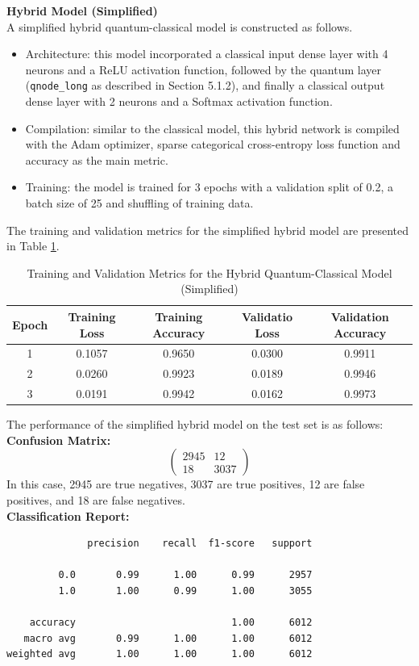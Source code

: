 \documentclass[10pt]{article}
\begin{document}
\noindent \textbf{Hybrid Model (Simplified)} \\
A simplified hybrid quantum-classical model is constructed as follows.
\begin{itemize}
    \item Architecture: this model incorporated a classical input dense layer with 4 neurons and a ReLU activation function, followed by the quantum layer (\texttt{qnode\_long} as described in Section 5.1.2), and finally a classical output dense layer with 2 neurons and a Softmax activation function.
    \item Compilation: similar to the classical model, this hybrid network is compiled with the Adam optimizer, sparse categorical cross-entropy loss function and accuracy as the main metric.
    \item Training: the model is trained for 3 epochs with a validation split of 0.2, a batch size of 25 and shuffling of training data.
\end{itemize}

The training and validation metrics for the simplified hybrid model are presented in Table \ref{tab:hybrid_simplified_model_metrics}.

\begin{table}[H]
    \centering
    \caption{Training and Validation Metrics for the Hybrid Quantum-Classical Model (Simplified)}
    \label{tab:hybrid_simplified_model_metrics}
    \begin{tabular}{|c|c|c|c|c|}
        \hline
        \textbf{Epoch} & \textbf{Training Loss} & \textbf{Training Accuracy} & \textbf{Validatio Loss} & \textbf{Validation Accuracy} \\
        \hline
        1 & 0.1057 & 0.9650 & 0.0300 & 0.9911 \\
        2 & 0.0260 & 0.9923 & 0.0189 & 0.9946 \\
        3 & 0.0191 & 0.9942 & 0.0162 & 0.9973 \\
        \hline
    \end{tabular}
\end{table}

\noindent The performance of the simplified hybrid model on the test set is as follows:\\
\textbf{Confusion Matrix:}
    \[
    \begin{pmatrix}
    2945 & 12 \\
    18 & 3037
    \end{pmatrix}
    \]
In this case, 2945 are true negatives, 3037 are true positives, 12 are false positives, and 18 are false negatives. \\
\textbf{Classification Report:}
\begin{verbatim}
              precision    recall  f1-score   support

         0.0       0.99      1.00      0.99      2957
         1.0       1.00      0.99      1.00      3055

    accuracy                           1.00      6012
   macro avg       0.99      1.00      1.00      6012
weighted avg       1.00      1.00      1.00      6012
\end{verbatim}
\end{document}
